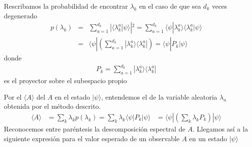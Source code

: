 \documentclass[letterpaper,10pt,english]{jupyterBook}
\newcommand{\bra}[1]{\langle #1|}
\newcommand{\ket}[1]{|#1\rangle}
\newcommand{\braket}[2]{\langle #1|#2\rangle}
\begin{document}
\sphinxAtStartPar
Rescribamos la probabilidad de encontrar \(\lambda_k\) en el caso de que sea \(d_k\) veces degenerado
\begin{eqnarray*}
p(\lambda_k) &=& \sum_{a=1}^{d_k} |\braket{\lambda^a_k}{\psi}|^2  = 
\sum_{a=1}^{d_k} \braket{\psi}{\lambda^a_k}\braket{\lambda^a_k}{\psi} \nonumber\\
&=&\bra{\psi} \left( \sum_{a=1}^{d_k} \ket{\lambda^a_k}\bra{\lambda^a_k}  \right) = \bra{\psi}P_k \ket{\psi} 
\end{eqnarray*}
\sphinxAtStartPar
donde
\begin{equation*}
\begin{split}
P_k = \sum_{a=1}^{d_k} \ket{\lambda^a_k}\bra{\lambda^a_k}
\end{split}
\end{equation*}
\sphinxAtStartPar
es el proyector sobre el subespacio propio

\sphinxAtStartPar
Por el  \(\langle A\rangle\) del  \(A\) en el estado \(\ket{\psi}\), entendemos el  de la variable aleatoria \(\lambda_n\) obtenida por el método descrito.
\label{equation:docs/Part_01_Formalismo/Chapter_02_01_Fundamentos_MC_myst:6814e2ac-dfc8-40d8-acd4-80130eeab3c8}\begin{eqnarray}
\langle A\rangle &=  \sum_k \lambda_k p(\lambda_k)
   =  \sum_k \lambda_k \bra{\psi}P_k\ket{\psi}  
&= \bra{\psi}\left(\sum_k \lambda_k P_k  \right) \ket{\psi} 
\end{eqnarray}
\sphinxAtStartPar
Reconocemos entre paréntesis la descomposición espectral de \(A\). Llegamos así a la siguiente expresión para el valor esperado de un observable \(A\) en un estado \(\ket{\psi}\)
\end{document}
